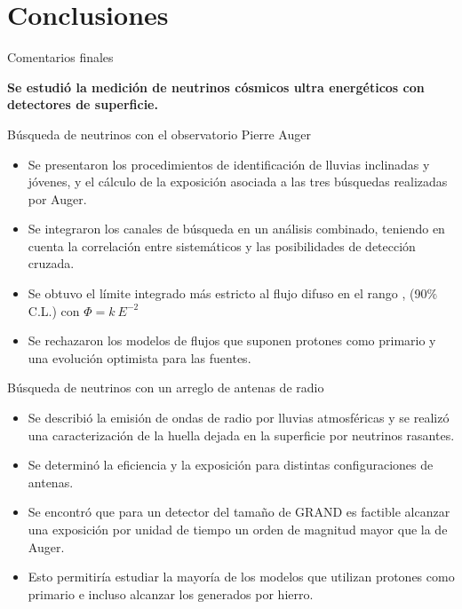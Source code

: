 \section[Conclusiones]{Conclusiones}

\begin{frame}{Comentarios finales}
\scriptsize
	\begin{block}{}
	\centering
	\textbf{Se estudi\'o la medici\'on de neutrinos c\'osmicos ultra energ\'eticos con detectores de superficie.}
	\end{block}
	
	\begin{exampleblock}{\centering B\'usqueda de neutrinos con el observatorio Pierre Auger}
	\begin{itemize}[<alert@+|+->]
	 \item Se presentaron los procedimientos de identificaci\'on de lluvias inclinadas y j\'ovenes, y el c\'alculo de la exposici\'on asociada a las tres b\'usquedas realizadas por Auger.
	 \item Se integraron los canales de b\'usqueda en un an\'alisis combinado, teniendo en cuenta la correlaci\'on entre sistem\'aticos y las posibilidades de detecci\'on cruzada.
	 \item Se obtuvo el l\'imite integrado m\'as estricto al flujo difuso en el rango ,  (90$\%$ C.L.) con $\Phi=k\ E^{-2}$
	 \item Se rechazaron los modelos de flujos que suponen protones como primario y una evoluci\'on optimista para las fuentes.
	\end{itemize}
	\end{exampleblock}
	
	\begin{alertblock}{\centering B\'usqueda de neutrinos con un arreglo de antenas de radio}
	\begin{itemize}[<alert@+|+->]
	 \item Se describi\'o la emisi\'on de ondas de radio por lluvias atmosf\'ericas y se realiz\'o una caracterizaci\'on de la huella dejada en la superficie por neutrinos rasantes.
	 \item Se determin\'o la eficiencia y la exposici\'on para distintas configuraciones de antenas.
	 \item Se encontr\'o que para un detector del tama\~no de GRAND es factible alcanzar una exposici\'on por unidad de tiempo un orden de magnitud mayor que la de Auger.
	 \item Esto permitir\'ia estudiar la mayor\'ia de los modelos que utilizan protones como primario e incluso alcanzar los generados por hierro.
	\end{itemize}
	\end{alertblock}

\end{frame}

